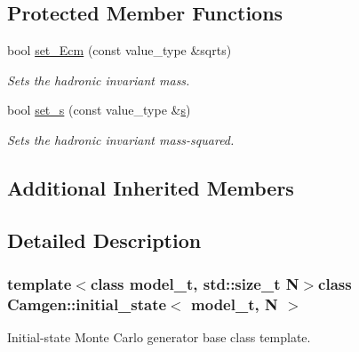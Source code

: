 \subsection*{Protected Member Functions}
\begin{DoxyCompactItemize}
\item 
\hypertarget{a00304_ae4fa907146215853ad8dbff1815a5ac2}{bool \hyperlink{a00304_ae4fa907146215853ad8dbff1815a5ac2}{set\-\_\-\-Ecm} (const value\-\_\-type \&sqrts)}\label{a00304_ae4fa907146215853ad8dbff1815a5ac2}

\begin{DoxyCompactList}\small\item\em Sets the hadronic invariant mass. \end{DoxyCompactList}\item 
\hypertarget{a00304_a1ab64d6e4d484d1688b83eab17ef05db}{bool \hyperlink{a00304_a1ab64d6e4d484d1688b83eab17ef05db}{set\-\_\-s} (const value\-\_\-type \&\hyperlink{a00304_ae2984255cbdaabc293b8168d93c767bf}{s})}\label{a00304_a1ab64d6e4d484d1688b83eab17ef05db}

\begin{DoxyCompactList}\small\item\em Sets the hadronic invariant mass-\/squared. \end{DoxyCompactList}\end{DoxyCompactItemize}
\subsection*{Additional Inherited Members}


\subsection{Detailed Description}
\subsubsection*{template$<$class model\-\_\-t, std\-::size\-\_\-t N$>$class Camgen\-::initial\-\_\-state$<$ model\-\_\-t, N $>$}

Initial-\/state Monte Carlo generator base class template. 

